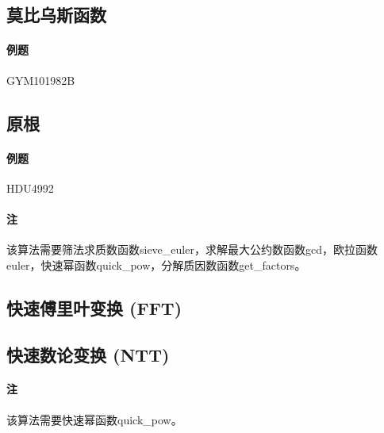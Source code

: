 \subsection{莫比乌斯函数}

\paragraph{例题} GYM101982B



\subsection{原根}

\paragraph{例题} HDU4992

\paragraph{注} 该算法需要筛法求质数函数sieve\_euler，求解最大公约数函数gcd，欧拉函数euler，快速幂函数quick\_pow，分解质因数函数get\_factors。



\subsection{快速傅里叶变换 (FFT)}


\subsection{快速数论变换 (NTT)}

\paragraph{注} 该算法需要快速幂函数quick\_pow。


